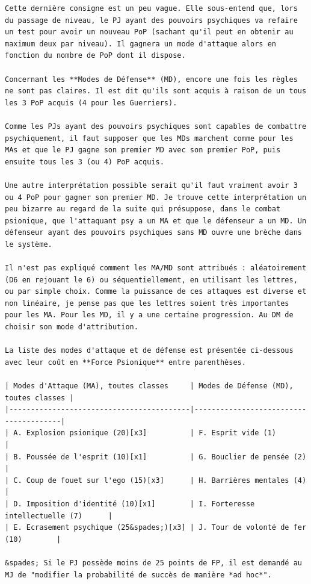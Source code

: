 \documentclass[12pt]{article}
\begin{document}
{\begin{verbatim}
Cette dernière consigne est un peu vague. Elle sous-entend que, lors du passage de niveau, le PJ ayant des pouvoirs psychiques va refaire un test pour avoir un nouveau PoP (sachant qu'il peut en obtenir au maximum deux par niveau). Il gagnera un mode d'attaque alors en fonction du nombre de PoP dont il dispose.

Concernant les **Modes de Défense** (MD), encore une fois les règles ne sont pas claires. Il est dit qu'ils sont acquis à raison de un tous les 3 PoP acquis (4 pour les Guerriers).

Comme les PJs ayant des pouvoirs psychiques sont capables de combattre psychiquement, il faut supposer que les MDs marchent comme pour les MAs et que le PJ gagne son premier MD avec son premier PoP, puis ensuite tous les 3 (ou 4) PoP acquis.

Une autre interprétation possible serait qu'il faut vraiment avoir 3 ou 4 PoP pour gagner son premier MD. Je trouve cette interprétation un peu bizarre au regard de la suite qui présuppose, dans le combat psionique, que l'attaquant psy a un MA et que le défenseur a un MD. Un défenseur ayant des pouvoirs psychiques sans MD ouvre une brèche dans le système.

Il n'est pas expliqué comment les MA/MD sont attribués : aléatoirement (D6 en rejouant le 6) ou séquentiellement, en utilisant les lettres, ou par simple choix. Comme la puissance de ces attaques est diverse et non linéaire, je pense pas que les lettres soient très importantes pour les MA. Pour les MD, il y a une certaine progression. Au DM de choisir son mode d'attribution.

La liste des modes d'attaque et de défense est présentée ci-dessous avec leur coût en **Force Psionique** entre parenthèses.

| Modes d'Attaque (MA), toutes classes     | Modes de Défense (MD), toutes classes |
|------------------------------------------|---------------------------------------|
| A. Explosion psionique (20)[x3]          | F. Esprit vide (1)                    |
| B. Poussée de l'esprit (10)[x1]          | G. Bouclier de pensée (2)             |
| C. Coup de fouet sur l'ego (15)[x3]      | H. Barrières mentales (4)             |
| D. Imposition d'identité (10)[x1]        | I. Forteresse intellectuelle (7)      |
| E. Ecrasement psychique (25&spades;)[x3] | J. Tour de volonté de fer (10)        |

&spades; Si le PJ possède moins de 25 points de FP, il est demandé au MJ de "modifier la probabilité de succès de manière *ad hoc*".


\end{verbatim}}
\end{document}
